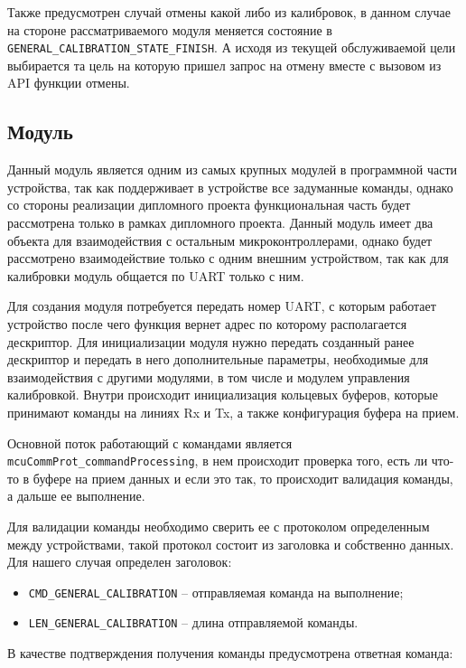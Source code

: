 Также предусмотрен случай отмены какой либо из калибровок, в данном случае на стороне рассматриваемого модуля меняется состояние в \lstinline{GENERAL_CALIBRATION_STATE_FINISH}.
А исходя из текущей обслуживаемой цели выбирается та цель на которую пришел запрос на отмену вместе с вызовом из API функции отмены.

\subsection{Модуль \moduleUart}

Данный модуль является одним из самых крупных модулей в программной части устройства, так как поддерживает в устройстве все задуманные команды, 
однако со стороны реализации дипломного проекта функциональная часть будет рассмотрена только в рамках дипломного проекта. Данный модуль имеет
два объекта для взаимодействия с остальным микроконтроллерами, однако будет рассмотрено взаимодействие только с одним внешним устройством, так как
для калибровки модуль общается по UART только с ним. 

Для создания модуля потребуется передать номер UART, с которым работает устройство после чего функция вернет адрес по которому располагается дескриптор.
Для инициализации модуля нужно передать созданный ранее дескриптор и передать в него дополнительные параметры, необходимые для взаимодействия с другими модулями,
в том числе и модулем управления калибровкой. Внутри происходит инициализация кольцевых буферов, которые принимают команды на линиях Rx и Tx, а также конфигурация
буфера на прием.

Основной поток работающий с командами является \lstinline{mcuCommProt_commandProcessing}, в нем происходит проверка того, есть ли что-то в буфере на прием данных
и если это так, то происходит валидация команды, а дальше ее выполнение.

Для валидации команды необходимо сверить ее с протоколом определенным между устройствами, такой протокол состоит из заголовка и собственно данных. Для нашего случая
определен заголовок: 

\begin{itemize}
    \item \lstinline{CMD_GENERAL_CALIBRATION} -- отправляемая команда на выполнение;
    \item \lstinline{LEN_GENERAL_CALIBRATION} -- длина отправляемой команды.
\end{itemize}

В качестве подтверждения получения команды предусмотрена ответная команда: 

